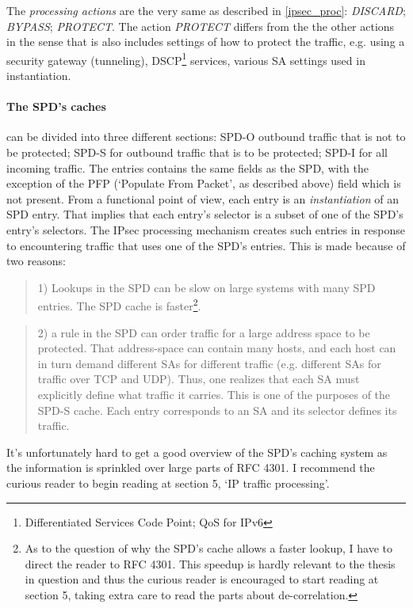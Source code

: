 \documentclass[final,a4paper,twoside,11pt,onecolumn]{report}
\begin{document}
The \emph{processing actions} are the very same as described in \ref{ipsec_proc}: \emph{DISCARD}; \emph{BYPASS}; \emph{PROTECT}. The action \emph{PROTECT} differs from the the other actions in the sense that is also includes settings of how to protect the traffic, e.g. using a security gateway (tunneling), DSCP\footnote{Differentiated Services Code Point; QoS for IPv6} services, various SA settings used in instantiation.

\paragraph{The SPD's caches} can be divided into three different sections: SPD-O outbound traffic that is not to be protected; SPD-S for outbound traffic that is to be protected; SPD-I for all incoming traffic. The entries contains the same fields as the SPD, with the exception of the PFP (`Populate From Packet', as described above) field which is not present. From a functional point of view, each entry is an \emph{instantiation} of an SPD entry. That implies that each entry's selector is a subset of one of the SPD's entry's selectors. The IPsec processing mechanism creates such entries in response to encountering traffic that uses one of the SPD's entries. This is made because of two reasons: 

\begin{quotation}
1) Lookups in the SPD can be slow on large systems with many SPD entries. The SPD cache is faster\footnote{As to the question of why the SPD's cache allows a faster lookup, I have to direct the reader to RFC 4301. This speedup is hardly relevant to the thesis in question and thus the curious reader is encouraged to start reading at section 5, taking extra care to read the parts about de-correlation.}.
\end{quotation}

\begin{quotation}
2) a rule in the SPD can order traffic for a large address space to be protected. That address-space can contain many hosts, and each host can in turn demand different SAs for different traffic (e.g. different SAs for traffic over TCP and UDP). Thus, one realizes that each SA must explicitly define what traffic it carries. This is one of the purposes of the SPD-S cache. Each entry corresponds to an SA and its selector defines its traffic.
\end{quotation}

It's unfortunately hard to get a good overview of the SPD's caching system as the information is sprinkled over large parts of RFC 4301. I recommend the curious reader to begin reading at section 5, `IP traffic processing'\citep[Section 5]{rfc4301}.
\end{document}
